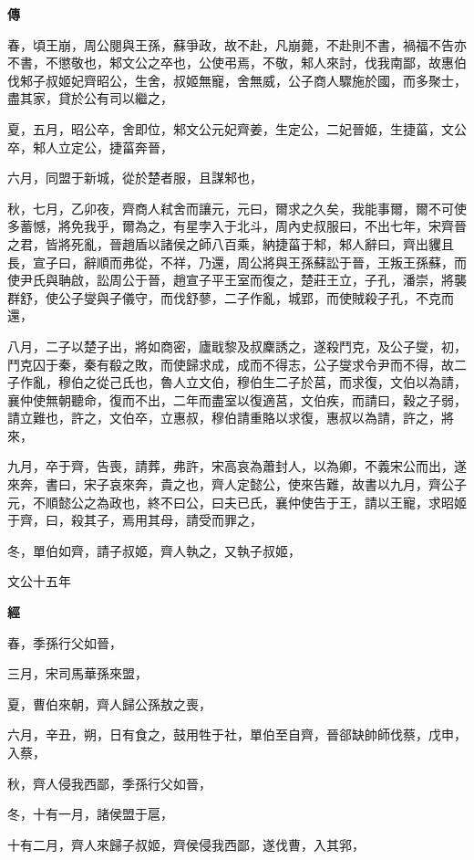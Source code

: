 \documentclass{ctexart}
\begin{document}
\textbf{傳}



春，頃王崩，周公閱與王孫，蘇爭政，故不赴，凡崩薨，不赴則不書，禍福不告亦不書，不懲敬也，邾文公之卒也，公使弔焉，不敬，邾人來討，伐我南鄙，故惠伯伐邾子叔姬妃齊昭公，生舍，叔姬無寵，舍無威，公子商人驟施於國，而多聚士，盡其家，貸於公有司以繼之，

夏，五月，昭公卒，舍即位，邾文公元妃齊姜，生定公，二妃晉姬，生捷菑，文公卒，邾人立定公，捷菑奔晉，

六月，同盟于新城，從於楚者服，且謀邾也，

秋，七月，乙卯夜，齊商人弒舍而讓元，元曰，爾求之久矣，我能事爾，爾不可使多蓄憾，將免我乎，爾為之，有星孛入于北斗，周內史叔服曰，不出七年，宋齊晉之君，皆將死亂，晉趙盾以諸侯之師八百乘，納捷菑于邾，邾人辭曰，齊出貜且長，宣子曰，辭順而弗從，不祥，乃還，周公將與王孫蘇訟于晉，王叛王孫蘇，而使尹氏與聃啟，訟周公于晉，趙宣子平王室而復之，楚莊王立，子孔，潘崇，將襲群舒，使公子燮與子儀守，而伐舒蓼，二子作亂，城郢，而使賊殺子孔，不克而還，

八月，二子以楚子出，將如商密，廬戢黎及叔麇誘之，遂殺鬥克，及公子燮，初，鬥克囚于秦，秦有殽之敗，而使歸求成，成而不得志，公子燮求令尹而不得，故二子作亂，穆伯之從己氏也，魯人立文伯，穆伯生二子於莒，而求復，文伯以為請，襄仲使無朝聽命，復而不出，二年而盡室以復適莒，文伯疾，而請曰，穀之子弱，請立難也，許之，文伯卒，立惠叔，穆伯請重賂以求復，惠叔以為請，許之，將來，

九月，卒于齊，告喪，請葬，弗許，宋高哀為蕭封人，以為卿，不義宋公而出，遂來奔，書曰，宋子哀來奔，貴之也，齊人定懿公，使來告難，故書以九月，齊公子元，不順懿公之為政也，終不曰公，曰夫已氏，襄仲使告于王，請以王寵，求昭姬于齊，曰，殺其子，焉用其母，請受而罪之，

冬，單伯如齊，請子叔姬，齊人執之，又執子叔姬，





文公十五年


\textbf{經}



春，季孫行父如晉，

三月，宋司馬華孫來盟，

夏，曹伯來朝，齊人歸公孫敖之喪，

六月，辛丑，朔，日有食之，鼓用牲于社，單伯至自齊，晉郤缺帥師伐蔡，戊申，入蔡，

秋，齊人侵我西鄙，季孫行父如晉，

冬，十有一月，諸侯盟于扈，

十有二月，齊人來歸子叔姬，齊侯侵我西鄙，遂伐曹，入其郛，
\end{document}
